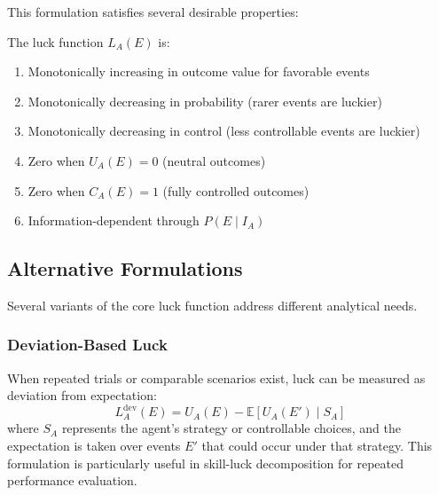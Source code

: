   This formulation satisfies several desirable properties:

  \begin{proposition}
    The luck function $L_{A}(E)$ is:
    \begin{enumerate}
      \item Monotonically increasing in outcome value for favorable events

      \item Monotonically decreasing in probability (rarer events are
        luckier)

      \item Monotonically decreasing in control (less controllable
        events are luckier)

      \item Zero when $U_{A}(E) = 0$ (neutral outcomes)

      \item Zero when $C_{A}(E) = 1$ (fully controlled outcomes)

      \item Information-dependent through $P(E \mid I_{A})$
    \end{enumerate}
  \end{proposition}

  \subsection{Alternative Formulations}

  Several variants of the core luck function address different
  analytical needs.

  \subsubsection{Deviation-Based Luck}

  When repeated trials or comparable scenarios exist, luck can be
  measured as deviation from expectation:
  \begin{equation}
    L_{A}^{\text{dev}}(E) = U_{A}(E) - \mathbb{E}[U_{A}(E') \mid S_{A}]
  \end{equation}
  where $S_{A}$ represents the agent's strategy or controllable choices,
  and the expectation is taken over events $E'$ that could occur under
  that strategy. This formulation is particularly useful in skill-luck decomposition
  for repeated performance evaluation.

